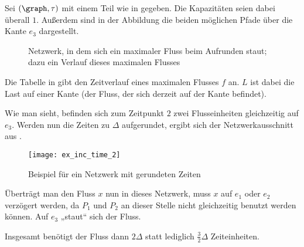 \begin{example}
    Sei $(\graph, \tau)$ mit einem Teil wie in  gegeben.
    Die Kapazitäten seien dabei überall $1$. Außerdem sind in der Abbildung die
    beiden möglichen Pfade über die Kante $e_3$ dargestellt.

    \newsavebox{\tempbox}
    \begin{figure}[H]
    \subfloat{\usebox{\tempbox}}%
    \qquad
      \caption{Netzwerk, in dem sich ein maximaler Fluss beim Aufrunden staut;
        dazu ein Verlauf dieses maximalen Flusses}\label{fig:ex_inc_time_1}
    \end{figure}

    Die Tabelle in  gibt den Zeitverlauf eines maximalen Flusses
    $f$ an. $L$ ist dabei die Last auf einer Kante (der Fluss, der sich
    derzeit auf der Kante befindet).

    Wie man sieht, befinden sich zum Zeitpunkt $2$ zwei Flusseinheiten gleichzeitig
    auf $e_3$. Werden nun die Zeiten zu $\Delta$ aufgerundet, ergibt sich der
    Netzwerkausschnitt aus .

    \begin{figure}[H]
    \centering
    \texttt{[image: ex\_inc\_time\_2]}
    \caption{Beispiel für ein Netzwerk mit gerundeten Zeiten}
    \label{fig:ex_inc_time_2}
    \end{figure}

     Überträgt man den Fluss $x$ nun
    in dieses Netzwerk, muss $x$ auf $e_1$ oder $e_2$ verzögert werden, da $P_1$
    und $P_2$ an dieser Stelle nicht gleichzeitig benutzt werden können.
    Auf $e_3$ „staut“ sich der Fluss.

    Insgesamt benötigt der Fluss dann $2\Delta$ statt lediglich $\frac{3}{2}\Delta$
    Zeiteinheiten.
\end{example}

